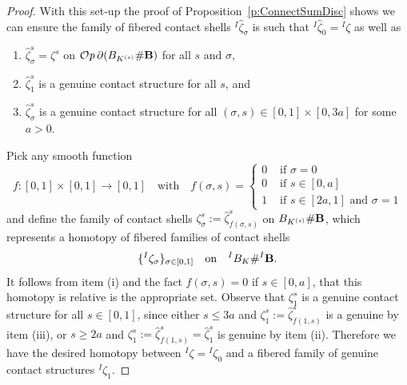 \documentclass[12pt]{paper}
\theoremstyle{plain}
\theoremstyle{definition}
\newcommand{\B}{{\bf B}}
\def\Op{{\mathcal O}{\it p}\,}
\numberwithin{figure}{section}
\begin{document}
\begin{proof}
	With this set-up the proof of Proposition~\ref{p:ConnectSumDisc} shows we can ensure
	the family of fibered contact shells ${}^I \hat\zeta_\sigma$ is such that ${}^I \hat\zeta_0 = {}^I \zeta$ as well as
	\begin{enumerate}
	\item $\hat\zeta_\sigma^s = \zeta^s$ on $\Op \partial(B_{K^{(s)}}\# \B)$ for all $s$ and $\sigma$,
	\item $\hat\zeta_1^s$ is a genuine contact structure for all $s$, and
	\item $\hat\zeta_\sigma^s$ is a genuine contact structure for all $(\sigma, s) \in [0,1] \times [0, 3a]$
	for some $a > 0$.
	\end{enumerate}
	Pick any smooth function
	$$
	f: [0,1] \times [0,1] \to [0,1] \quad\mbox{with}\quad
		f(\sigma, s) = \begin{cases} 
		0 & \mbox{ if $\sigma = 0$}\\
		0 & \mbox{ if $s \in [0, a]$}\\
		1 & \mbox{ if $s \in [2a, 1]$ and $\sigma =1$}
		\end{cases}
	$$
	and define the family of contact shells $\zeta_\sigma^s := \hat\zeta_{f(\sigma, s)}^s$ on $B_{K^{(s)}}\#\B$,
	which represents a homotopy of fibered families of contact shells
	$$
	 \{{}^I \zeta_\sigma\}_{\sigma \in [0,1]}  \quad\mbox{on}\quad {}^I B_K\# {}^I \B.
	$$
	It follows from item (i) and the fact $f(\sigma, s) = 0$ if $s \in [0,a]$, that this homotopy is relative is the appropriate set.
	Observe that $\zeta_1^s$ is a genuine contact structure for all $s \in [0,1]$, since either $s \leq 3a$
	and $\zeta_1^s := \hat\zeta_{f(1,s)}^s$ is a genuine by item (iii), or
	$s \geq 2a$ and $\zeta_1^s :=  \hat\zeta_{f(1,s)}^s = \hat\zeta_{1}^s$ is genuine by item (ii).
	Therefore we have the desired homotopy between ${}^I \zeta = {}^I \zeta_0$ and a fibered family
	of genuine contact structures ${}^I \zeta_1$.
\end{proof}
\end{document}
